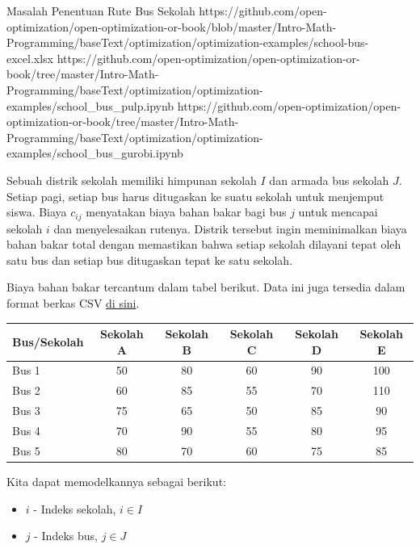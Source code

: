 \begin{examplewithallcode}{Masalah Penentuan Rute Bus Sekolah}
{https://github.com/open-optimization/open-optimization-or-book/blob/master/Intro-Math-Programming/baseText/optimization/optimization-examples/school-bus-excel.xlsx}
{https://github.com/open-optimization/open-optimization-or-book/tree/master/Intro-Math-Programming/baseText/optimization/optimization-examples/school_bus_pulp.ipynb}
{https://github.com/open-optimization/open-optimization-or-book/tree/master/Intro-Math-Programming/baseText/optimization/optimization-examples/school_bus_gurobi.ipynb}

Sebuah distrik sekolah memiliki himpunan sekolah \( I \) dan armada bus sekolah \( J \). Setiap pagi, setiap bus harus ditugaskan ke suatu sekolah untuk menjemput siswa. Biaya \( c_{ij} \) menyatakan biaya bahan bakar bagi bus \( j \) untuk mencapai sekolah \( i \) dan menyelesaikan rutenya. Distrik tersebut ingin meminimalkan biaya bahan bakar total dengan memastikan bahwa setiap sekolah dilayani tepat oleh satu bus dan setiap bus ditugaskan tepat ke satu sekolah.

Biaya bahan bakar tercantum dalam tabel berikut. Data ini juga tersedia dalam format berkas CSV \href{https://github.com/open-optimization/open-optimization-or-examples/blob/master/integer-programming/school_bus_data.csv}{di sini}.
\begin{tabular}{l|ccccc}
\toprule
Bus/Sekolah & Sekolah A & Sekolah B & Sekolah C & Sekolah D & Sekolah E \\
\midrule
Bus 1 & 50 & 80 & 60 & 90 & 100 \\
Bus 2 & 60 & 85 & 55 & 70 & 110 \\
Bus 3 & 75 & 65 & 50 & 85 & 90 \\
Bus 4 & 70 & 90 & 55 & 80 & 95 \\
Bus 5 & 80 & 70 & 60 & 75 & 85 \\
\bottomrule
\end{tabular}
\par{}\label{tab:modeling-sums-tab03}%


Kita dapat memodelkannya sebagai berikut:

\begin{itemize}
    \item \(i \) - Indeks sekolah, \(i \in I\)
    \item \(j \) - Indeks bus, \(j \in J\)
\end{itemize}


\end{examplewithallcode}
